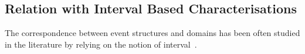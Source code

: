         
      
  


  
  




\subsection{Relation with Interval Based Characterisations}
\label{ss:intervals}

The correspondence between event structures and domains has been often
studied in the literature by relying on the notion of
interval~\cite{Winskel:phd,NPW:PNES,Win:ES,Dro:ESD}.

